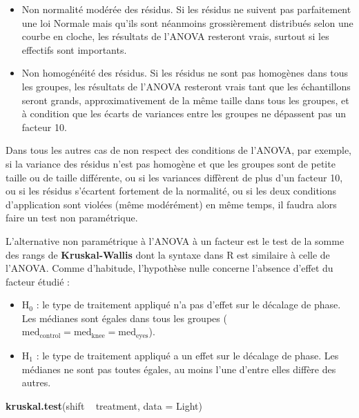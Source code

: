 \documentclass[
  a4paper,
]{article}
\newenvironment{Shaded}{\begin{snugshade}}{\end{snugshade}}
\newcommand{\DataTypeTok}[1]{\textcolor[rgb]{0.00,0.34,0.68}{#1}}
\newcommand{\KeywordTok}[1]{\textcolor[rgb]{0.12,0.11,0.11}{\textbf{#1}}}
\newcommand{\NormalTok}[1]{\textcolor[rgb]{0.12,0.11,0.11}{#1}}
\newcommand{\OperatorTok}[1]{\textcolor[rgb]{0.12,0.11,0.11}{#1}}
\newcommand{\StringTok}[1]{\textcolor[rgb]{0.75,0.01,0.01}{#1}}
\providecommand{\tightlist}{%
  \setlength{\itemsep}{0pt}\setlength{\parskip}{0pt}}
\begin{document}
\begin{itemize}
\tightlist
\item
  Non normalité modérée des résidus. Si les résidus ne suivent pas parfaitement une loi Normale mais qu'ils sont néanmoins grossièrement distribués selon une courbe en cloche, les résultats de l'ANOVA resteront vrais, surtout si les effectifs sont importants.
\item
  Non homogénéité des résidus. Si les résidus ne sont pas homogènes dans tous les groupes, les résultats de l'ANOVA resteront vrais tant que les échantillons seront grands, approximativement de la même taille dans tous les groupes, et à condition que les écarts de variances entre les groupes ne dépassent pas un facteur 10.
\end{itemize}

Dans tous les autres cas de non respect des conditions de l'ANOVA, par exemple, si la variance des résidus n'est pas homogène et que les groupes sont de petite taille ou de taille différente, ou si les variances diffèrent de plus d'un facteur 10, ou si les résidus s'écartent fortement de la normalité, ou si les deux conditions d'application sont violées (même modérément) en même temps, il faudra alors faire un test non paramétrique.

L'alternative non paramétrique à l'ANOVA à un facteur est le test de la somme des rangs de \textbf{Kruskal-Wallis} dont la syntaxe dans R est similaire à celle de l'ANOVA. Comme d'habitude, l'hypothèse nulle concerne l'absence d'effet du facteur étudié :

\begin{itemize}
\tightlist
\item
  H\(_0\) : le type de traitement appliqué n'a pas d'effet sur le décalage de phase. Les médianes sont égales dans tous les groupes (\(\textrm{med}_\textrm{control} = \textrm{med}_\textrm{knee} = \textrm{med}_\textrm{eyes}\)).
\item
  H\(_1\) : le type de traitement appliqué a un effet sur le décalage de phase. Les médianes ne sont pas toutes égales, au moins l'une d'entre elles diffère des autres.
\end{itemize}

\begin{Shaded}
\begin{Highlighting}[]
\KeywordTok{kruskal.test}\NormalTok{(shift }\OperatorTok{~}\StringTok{ }\NormalTok{treatment, }\DataTypeTok{data =}\NormalTok{ Light)}
\end{Highlighting}
\end{Shaded}
\end{document}
